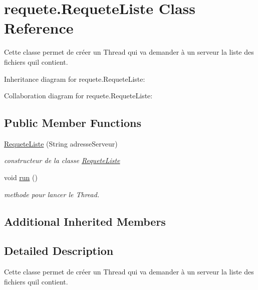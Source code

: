 \hypertarget{classrequete_1_1RequeteListe}{}\section{requete.\+Requete\+Liste Class Reference}
\label{classrequete_1_1RequeteListe}


Cette classe permet de créer un Thread qui va demander à un serveur la liste des fichiers qu\textquotesingle{}il contient.  




Inheritance diagram for requete.\+Requete\+Liste\+:


Collaboration diagram for requete.\+Requete\+Liste\+:
\subsection*{Public Member Functions}
\begin{DoxyCompactItemize}
\item 
\hyperlink{classrequete_1_1RequeteListe_abf11f2cbe8b9eb9eae7621dff966ebd5}{Requete\+Liste} (String adresse\+Serveur)
\begin{DoxyCompactList}\small\item\em constructeur de la classe \hyperlink{classrequete_1_1RequeteListe}{Requete\+Liste} \end{DoxyCompactList}\item 
\mbox{\label{classrequete_1_1RequeteListe_a744397e5813266c362903f65965e0e4e}} 
void \hyperlink{classrequete_1_1RequeteListe_a744397e5813266c362903f65965e0e4e}{run} ()
\begin{DoxyCompactList}\small\item\em methode pour lancer le Thread. \end{DoxyCompactList}\end{DoxyCompactItemize}
\subsection*{Additional Inherited Members}


\subsection{Detailed Description}
Cette classe permet de créer un Thread qui va demander à un serveur la liste des fichiers qu\textquotesingle{}il contient. 

